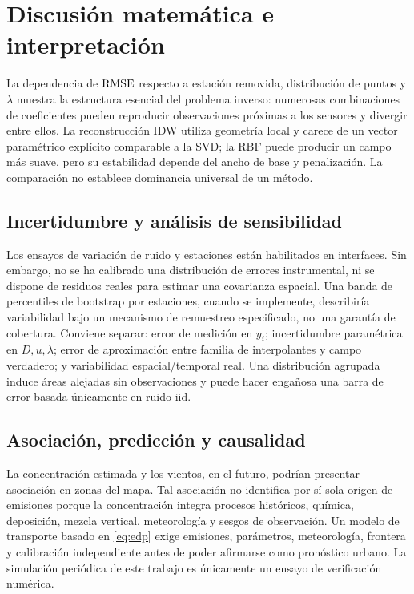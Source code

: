 \section{Discusión matemática e interpretación}\label{sec:discusion}
La dependencia de $\mathrm{RMSE}$ respecto a estación removida, distribución de puntos y $\lambda$ muestra la estructura esencial del problema inverso: numerosas combinaciones de coeficientes pueden reproducir observaciones próximas a los sensores y divergir entre ellos. La reconstrucción IDW utiliza geometría local y carece de un vector paramétrico explícito comparable a la SVD; la RBF puede producir un campo más suave, pero su estabilidad depende del ancho de base y penalización. La comparación no establece dominancia universal de un método.

\subsection{Incertidumbre y análisis de sensibilidad}\label{sec:incertidumbre}
Los ensayos de variación de ruido y estaciones están habilitados en interfaces. Sin embargo, no se ha calibrado una distribución de errores instrumental, ni se dispone de residuos reales para estimar una covarianza espacial. Una banda de percentiles de bootstrap por estaciones, cuando se implemente, describiría variabilidad bajo un mecanismo de remuestreo especificado, no una garantía de cobertura. Conviene separar: error de medición en $y_i$; incertidumbre paramétrica en $D,u,\lambda$; error de aproximación entre familia de interpolantes y campo verdadero; y variabilidad espacial/temporal real. Una distribución agrupada induce áreas alejadas sin observaciones y puede hacer engañosa una barra de error basada únicamente en ruido iid.

\subsection{Asociación, predicción y causalidad}
La concentración estimada y los vientos, en el futuro, podrían presentar asociación en zonas del mapa. Tal asociación no identifica por sí sola origen de emisiones porque la concentración integra procesos históricos, química, deposición, mezcla vertical, meteorología y sesgos de observación. Un modelo de transporte basado en \eqref{eq:edp} exige emisiones, parámetros, meteorología, frontera y calibración independiente antes de poder afirmarse como pronóstico urbano. La simulación periódica de este trabajo es únicamente un ensayo de verificación numérica.

